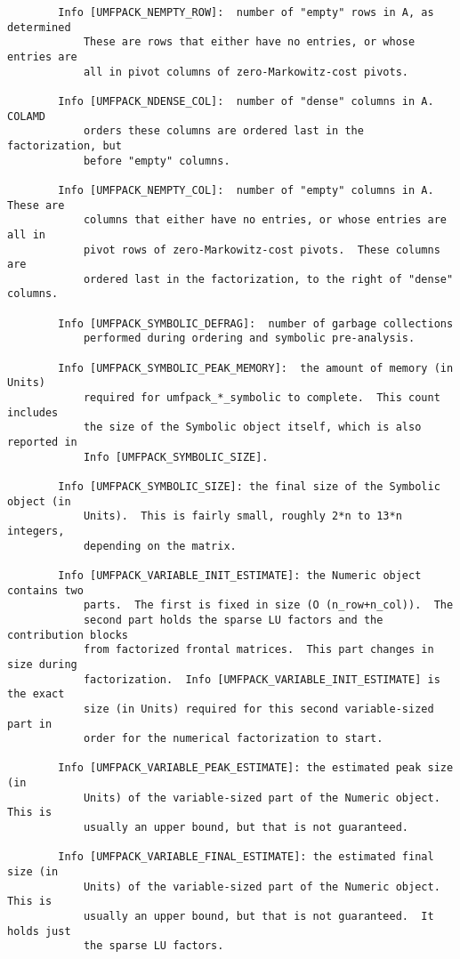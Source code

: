 \documentclass[11pt]{article}
\begin{document}
{\begin{verbatim}
        Info [UMFPACK_NEMPTY_ROW]:  number of "empty" rows in A, as determined
            These are rows that either have no entries, or whose entries are
            all in pivot columns of zero-Markowitz-cost pivots.

        Info [UMFPACK_NDENSE_COL]:  number of "dense" columns in A.  COLAMD
            orders these columns are ordered last in the factorization, but
            before "empty" columns.

        Info [UMFPACK_NEMPTY_COL]:  number of "empty" columns in A.  These are
            columns that either have no entries, or whose entries are all in
            pivot rows of zero-Markowitz-cost pivots.  These columns are
            ordered last in the factorization, to the right of "dense" columns.

        Info [UMFPACK_SYMBOLIC_DEFRAG]:  number of garbage collections
            performed during ordering and symbolic pre-analysis.

        Info [UMFPACK_SYMBOLIC_PEAK_MEMORY]:  the amount of memory (in Units)
            required for umfpack_*_symbolic to complete.  This count includes
            the size of the Symbolic object itself, which is also reported in
            Info [UMFPACK_SYMBOLIC_SIZE].

        Info [UMFPACK_SYMBOLIC_SIZE]: the final size of the Symbolic object (in
            Units).  This is fairly small, roughly 2*n to 13*n integers,
            depending on the matrix.

        Info [UMFPACK_VARIABLE_INIT_ESTIMATE]: the Numeric object contains two
            parts.  The first is fixed in size (O (n_row+n_col)).  The
            second part holds the sparse LU factors and the contribution blocks
            from factorized frontal matrices.  This part changes in size during
            factorization.  Info [UMFPACK_VARIABLE_INIT_ESTIMATE] is the exact
            size (in Units) required for this second variable-sized part in
            order for the numerical factorization to start.

        Info [UMFPACK_VARIABLE_PEAK_ESTIMATE]: the estimated peak size (in
            Units) of the variable-sized part of the Numeric object.  This is
            usually an upper bound, but that is not guaranteed.

        Info [UMFPACK_VARIABLE_FINAL_ESTIMATE]: the estimated final size (in
            Units) of the variable-sized part of the Numeric object.  This is
            usually an upper bound, but that is not guaranteed.  It holds just
            the sparse LU factors.


\end{verbatim}}
\end{document}
